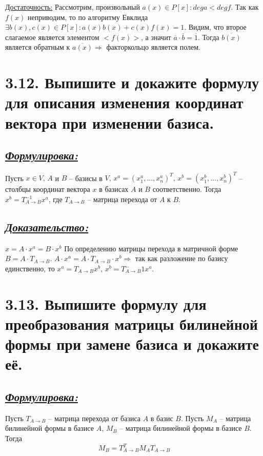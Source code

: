 \documentclass{article}
\begin{document}
\underline{Достаточность:}
\newline Рассмотрим, произвольный $a(x) \in P[x] : dega < degf$. Так как $f(x)$ неприводим, то по алгоритму Евклида $\exists b(x), c(x) \in P[x] : a(x) b(x) + c(x) f(x) = 1$. Видим, что второе слагаемое является элементом $<f(x)>$, а значит $\overline{a}\cdot \overline{b} = \overline{1}$. Тогда $\overline{b(x)}$ является обратным к $\overline{a(x)} \Rightarrow$ факторкольцо является полем. 

\section*{\LARGE 3.12. Выпишите и докажите формулу для описания изменения координат вектора при изменении базиса. }
\subsection*{\Large \underline{\textit{Формулировка: }}}
Пусть $x \in V,\, A$ и $B$ -- базисы в $V, \, x^a = (x_1^a, ..., x_n^a)^T, \, x^b = (x_1^b, ..., x_n^b)^T$ -- столбцы координат вектора $x$ в базисах $A$ и $B$ соответственно. Тогда $x^b = T_{A \rightarrow B}^{-1} x^a$, где $T_{A \rightarrow B}$ -- матрица перехода от $A$ к $B$.

\subsection*{\Large \underline{\textit{Доказательство: }}}
$x = A \cdot x^a = B \cdot x^b$
\newline По определению матрицы перехода в матричной форме $B = A \cdot T_{A \rightarrow B}$.
\newline $A \cdot x^a = A \cdot T_{A \rightarrow B} \cdot x^b \Rightarrow$ так как разложение по базису единственно, то $x^a = T_{A \rightarrow B} x^b,\, x^b = T_{A \rightarrow B}^-1 x^a$.

\section*{\LARGE 3.13. Выпишите формулу для преобразования матрицы билинейной формы при замене базиса и докажите её. }
\subsection*{\Large \underline{\textit{Формулировка: }}}
Пусть $T_{A \rightarrow B}$ -- матрица перехода от базиса $A$ в базис $B$. Пусть $M_A$ -- матрица билинейной формы в базисе $A$, $M_B$ -- матрица билинейной формы в базисе $B$. Тогда 
$$
M_B = T_{A \rightarrow B}^T M_A T_{A \rightarrow B}
$$
\end{document}
